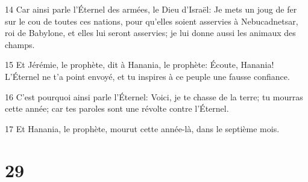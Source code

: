 \par 14 Car ainsi parle l'Éternel des armées, le Dieu d'Israël: Je mets un joug de fer sur le cou de toutes ces nations, pour qu'elles soient asservies à Nebucadnetsar, roi de Babylone, et elles lui seront asservies; je lui donne aussi les animaux des champs.
\par 15 Et Jérémie, le prophète, dit à Hanania, le prophète: Écoute, Hanania! L'Éternel ne t'a point envoyé, et tu inspires à ce peuple une fausse confiance.
\par 16 C'est pourquoi ainsi parle l'Éternel: Voici, je te chasse de la terre; tu mourras cette année; car tes paroles sont une révolte contre l'Éternel.
\par 17 Et Hanania, le prophète, mourut cette année-là, dans le septième mois.

\chapter{29}

